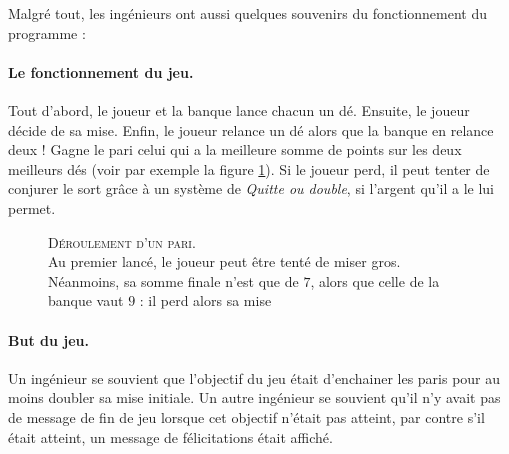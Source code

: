 \documentclass{article}
\begin{document}
Malgré tout, les ingénieurs ont aussi quelques souvenirs du fonctionnement du programme :

\paragraph{Le fonctionnement du jeu.} Tout d'abord, le joueur et la banque lance chacun un dé. Ensuite, le joueur décide de sa mise. Enfin, le joueur relance un dé alors que la banque en relance deux ! Gagne le pari celui qui a la meilleure somme de points sur les deux meilleurs dés (voir par exemple la figure \ref{exemple}). Si le joueur perd, il peut tenter de conjurer le sort grâce à un système de \emph{Quitte ou double}, si l'argent qu'il a le lui permet.

\begin{figure}[h]
	\caption	{	\textsc{Déroulement d'un pari.}
						\\
						Au premier lancé, le joueur peut être tenté de miser gros.
						\\
						Néanmoins, sa somme finale n'est que de $7$, alors que celle de la banque vaut $9$ :
						il perd alors sa mise
					}
		\label{exemple}
\end{figure}

\paragraph{But du jeu.} Un ingénieur se souvient que l'objectif du jeu était d'enchainer les paris pour
au moins doubler sa mise initiale. Un autre ingénieur se souvient qu'il n'y avait pas de message de fin de jeu
lorsque cet objectif n'était pas atteint, par contre s'il était atteint, un message de félicitations était affiché.
\end{document}
